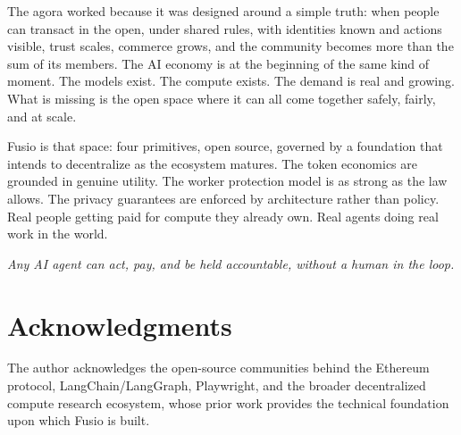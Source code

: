 \documentclass[10pt,twocolumn]{article}
\begin{document}
The agora worked because it was designed around a simple truth: when people can transact in the open, under shared rules, with identities known and actions visible, trust scales, commerce grows, and the community becomes more than the sum of its members. The AI economy is at the beginning of the same kind of moment. The models exist. The compute exists. The demand is real and growing. What is missing is the open space where it can all come together safely, fairly, and at scale.

Fusio is that space: four primitives, open source, governed by a foundation that intends to decentralize as the ecosystem matures. The token economics are grounded in genuine utility. The worker protection model is as strong as the law allows. The privacy guarantees are enforced by architecture rather than policy. Real people getting paid for compute they already own. Real agents doing real work in the world.

\begin{center}
\textit{Any AI agent can act, pay, and be held accountable, without a human in the loop.}
\end{center}

\section*{Acknowledgments}
\label{sec:ack}

The author acknowledges the open-source communities behind the Ethereum protocol, LangChain/LangGraph, Playwright, and the broader decentralized compute research ecosystem, whose prior work provides the technical foundation upon which Fusio is built.
\end{document}
